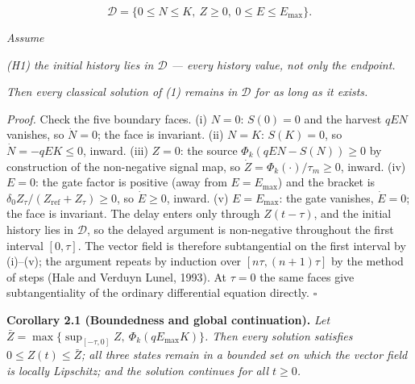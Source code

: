 \documentclass[11pt]{article}
\begin{document}
\[\mathcal{D} = \{ 0 \le N \le K,\ Z \ge 0,\ 0 \le E \le E_{\max} \}.\]

\emph{Assume}

\emph{(H1) the initial history lies in \(\mathcal{D}\) --- every history
value, not only the endpoint.}

\emph{Then every classical solution of (1) remains in \(\mathcal{D}\)
for as long as it exists.}

\emph{Proof.} Check the five boundary faces. (i) \(N = 0\): \(S(0) = 0\)
and the harvest \(qEN\) vanishes, so \(\dot N = 0\); the face is
invariant. (ii) \(N = K\): \(S(K) = 0\), so \(\dot N = -qEK \le 0\),
inward. (iii) \(Z = 0\): the source \(\Phi_k(qEN - S(N)) \ge 0\) by
construction of the non-negative signal map, so
\(\dot Z = \Phi_k(\cdot)/\tau_m \ge 0\), inward. (iv) \(E = 0\): the
gate factor is positive (away from \(E = E_{\max}\)) and the bracket is
\(\delta_0 Z_\tau/(Z_{\mathrm{ref}} + Z_\tau) \ge 0\), so
\(\dot E \ge 0\), inward. (v) \(E = E_{\max}\): the gate vanishes,
\(\dot E = 0\); the face is invariant. The delay enters only through
\(Z(t - \tau)\), and the initial history lies in \(\mathcal{D}\), so the
delayed argument is non-negative throughout the first interval
\([0, \tau]\). The vector field is therefore subtangential on the first
interval by (i)--(v); the argument repeats by induction over
\([n\tau, (n+1)\tau]\) by the method of steps (Hale and Verduyn Lunel,
1993). At \(\tau = 0\) the same faces give subtangentiality of the
ordinary differential equation directly. \ensuremath{\square}

\textbf{Corollary 2.1 (Boundedness and global continuation).} \emph{Let
\(\bar Z = \max\{ \sup_{[-\tau,0]} Z,\ \Phi_k(qE_{\max}K) \}\). Then
every solution satisfies \(0 \le Z(t) \le \bar Z\); all three states
remain in a bounded set on which the vector field is locally Lipschitz;
and the solution continues for all \(t \ge 0\).}
\end{document}
